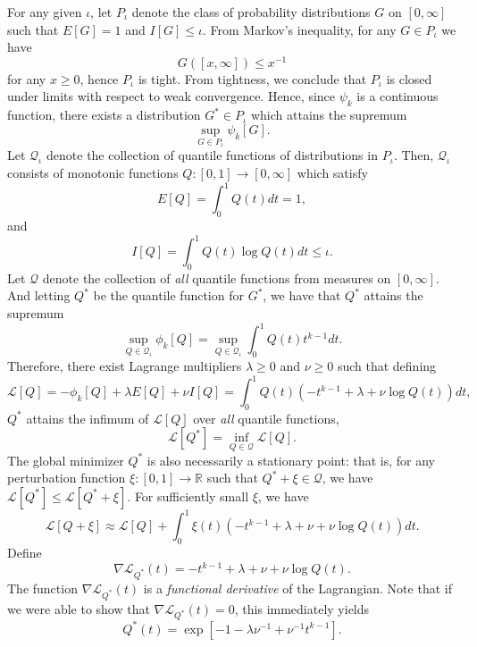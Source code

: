 \documentclass[12pt]{article}
\begin{document}
For any given $\iota$, let $P_\iota$ denote the class of probability
distributions $G$ on $[0, \infty]$ such that $E[G]=1$ and
$I[G] \leq \iota.$  From Markov's inequality, for any $G \in P_\iota$
we have
\[
G([x, \infty]) \leq x^{-1}
\]
for any $x \geq 0$, hence $P_\iota$ is tight.  From tightness, we
conclude that $P_\iota$ is closed under limits with respect to weak
convergence.  Hence, since $\psi_k$ is a continuous function, there
exists a distribution $G^* \in P_\iota$ which attains the supremum
\[\sup_{G \in P_\iota} \psi_k[G].\]
Let $\mathcal{Q}_\iota$ denote the collection of quantile functions of
distributions in $P_\iota.$ Then, $\mathcal{Q}_\iota$ consists of monotonic functions
$Q: [0,1] \to [0, \infty]$ which
satisfy
\[
E[Q] = \int_0^1 Q(t) dt = 1,
\]
and
\[
I[Q] = \int_0^1 Q(t) \log Q(t) dt \leq \iota.
\]
Let $\mathcal{Q}$ denote the collection of \emph{all} quantile functions from measures on $[0,\infty]$.
And letting $Q^*$ be the quantile function for $G^*$, we have that
$Q^*$ attains the supremum
\begin{equation}\label{eq:constrained_optim}
\sup_{Q \in \mathcal{Q}_\iota} \phi_k[Q] = \sup_{Q \in \mathcal{Q}_\iota} \int_0^1 Q(t) t^{k-1} dt.
\end{equation}
Therefore, there exist Lagrange multipliers
$\lambda \geq 0$ and $\nu \geq 0$ such that defining
\[
\mathcal{L}[Q] = -\phi_k[Q] + \lambda E[Q] + \nu I[Q]= \int_0^1 Q(t) (-t^{k-1} + \lambda + \nu \log Q(t)) dt,
\]
$Q^*$ attains the infimum of $\mathcal{L}[Q]$ over \emph{all} quantile functions,
\[
\mathcal{L}[Q^*] = \inf_{Q \in \mathcal{Q}}\mathcal{L}[Q].
\]
The global minimizer $Q^*$ is also necessarily a stationary point:
that is, for any perturbation function $\xi: [0,1] \to \mathbb{R}$
such that $Q^* + \xi \in \mathcal{Q}$, we have $\mathcal{L}[Q^*]\leq \mathcal{L}[Q^* + \xi]$.
For sufficiently small $\xi$, we have
\begin{equation}\label{eq:Lperturb}
\mathcal{L}[Q + \xi] \approx \mathcal{L}[Q] + \int_0^1 \xi(t) (-t^{k-1} + \lambda + \nu + \nu \log Q(t)) dt.
\end{equation}
Define
\begin{equation}\label{eq:nablaQ}
\nabla \mathcal{L}_{Q^*}(t) = -t^{k-1} + \lambda + \nu + \nu \log Q(t).
\end{equation}
The function $\nabla \mathcal{L}_{Q^*}(t)$ is a \emph{functional derivative} of the Lagrangian.
Note that if we were able to show that $\nabla \mathcal{L}_{Q^*}(t) = 0$,
this immediately yields
\begin{equation}\label{eq:Qstareq}
Q^*(t) = \exp[-1 -\lambda\nu^{-1} + \nu^{-1}  t^{k-1}].
\end{equation}
\end{document}
